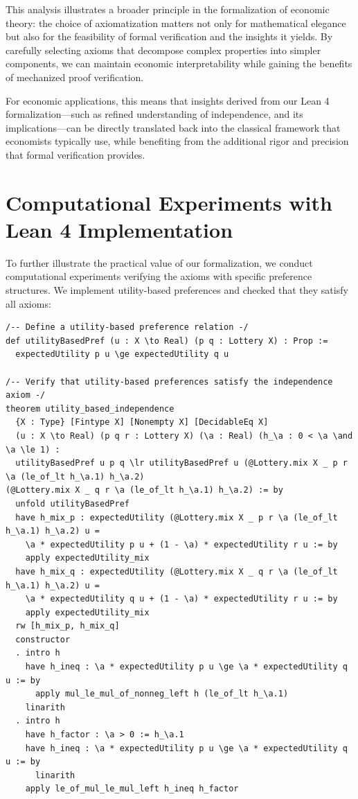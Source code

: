 \documentclass{article}
\theoremstyle{definition}
\begin{document}
This analysis illustrates a broader principle in the formalization of economic theory: the choice of axiomatization matters not only for mathematical elegance but also for the feasibility of formal verification and the insights it yields. By carefully selecting axioms that decompose complex properties into simpler components, we can maintain economic interpretability while gaining the benefits of mechanized proof verification.

For economic applications, this means that insights derived from our Lean 4 formalization—such as refined understanding of independence, and its implications—can be directly translated back into the classical framework that economists typically use, while benefiting from the additional rigor and precision that formal verification provides.

\section{Computational Experiments with Lean 4 Implementation}\label{sec: Comput exp}

To further illustrate the practical value of our formalization, we conduct computational experiments verifying the axioms with specific preference structures. We implement utility-based preferences and checked that they satisfy all axioms:

\begin{lstlisting}[caption={Computational Experiments with Lean 4 Implementation}]
/-- Define a utility-based preference relation -/
def utilityBasedPref (u : X \to Real) (p q : Lottery X) : Prop :=
  expectedUtility p u \ge expectedUtility q u

/-- Verify that utility-based preferences satisfy the independence axiom -/
theorem utility_based_independence
  {X : Type} [Fintype X] [Nonempty X] [DecidableEq X]
  (u : X \to Real) (p q r : Lottery X) (\a : Real) (h_\a : 0 < \a \and \a \le 1) :
  utilityBasedPref u p q \lr utilityBasedPref u (@Lottery.mix X _ p r \a (le_of_lt h_\a.1) h_\a.2)
(@Lottery.mix X _ q r \a (le_of_lt h_\a.1) h_\a.2) := by
  unfold utilityBasedPref
  have h_mix_p : expectedUtility (@Lottery.mix X _ p r \a (le_of_lt h_\a.1) h_\a.2) u =
    \a * expectedUtility p u + (1 - \a) * expectedUtility r u := by
    apply expectedUtility_mix
  have h_mix_q : expectedUtility (@Lottery.mix X _ q r \a (le_of_lt h_\a.1) h_\a.2) u =
    \a * expectedUtility q u + (1 - \a) * expectedUtility r u := by
    apply expectedUtility_mix
  rw [h_mix_p, h_mix_q]
  constructor
  . intro h
    have h_ineq : \a * expectedUtility p u \ge \a * expectedUtility q u := by
      apply mul_le_mul_of_nonneg_left h (le_of_lt h_\a.1)
    linarith
  . intro h
    have h_factor : \a > 0 := h_\a.1
    have h_ineq : \a * expectedUtility p u \ge \a * expectedUtility q u := by
      linarith
    apply le_of_mul_le_mul_left h_ineq h_factor
\end{lstlisting}
\end{document}
